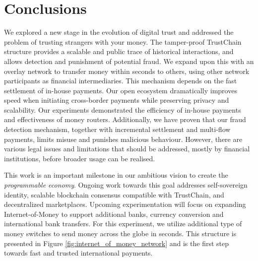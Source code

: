\section{Conclusions}
We explored a new stage in the evolution of digital trust and addressed the problem of trusting strangers with your money.
The tamper-proof TrustChain structure provides a scalable and public trace of historical interactions, and allows detection and punishment of potential fraud.
We expand upon this with an overlay network to transfer money within seconds to others, using other network participants as financial intermediaries.
This mechanism depends on the fast settlement of in-house payments.
Our open ecosystem dramatically improves speed when initiating cross-border payments while preserving privacy and scalability.
Our experiments demonstrated the efficiency of in-house payments and effectiveness of money routers.
Additionally, we have proven that our fraud detection mechanism, together with incremental settlement and multi-flow payments, limits misuse and punishes malicious behaviour.
However, there are various legal issues and limitations that should be addressed, mostly by financial institutions, before broader usage can be realised.

This work is an important milestone in our ambitious vision to create the \emph{programmable economy}.
Ongoing work towards this goal addresses self-sovereign identity, scalable blockchain consensus compatible with TrustChain, and decentralized marketplaces.
Upcoming experimentation will focus on expanding Internet-of-Money to support additional banks, currency conversion and international bank transfers.
For this experiment, we utilize additional type of money switches to send money across the globe in seconds.
This structure is presented in Figure \ref{fig:internet_of_money_network} and is the first step towards fast and trusted international payments.